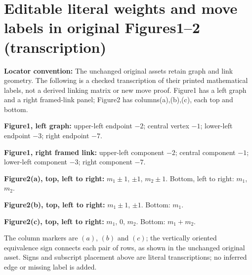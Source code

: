 \section*{Editable literal weights and move labels in original Figures1--2 (transcription)}
\noindent\textbf{Locator convention:} The unchanged original assets retain graph and link geometry. The following is a checked transcription of their printed mathematical labels, not a derived linking matrix or new move proof. Figure1 has a left graph and a right framed-link panel; Figure2 has columns(a),(b),(c), each top and bottom.
\par\medskip
\noindent\textbf{Figure1, left graph:} upper-left endpoint $-2$; central vertex $-1$; lower-left endpoint $-3$; right endpoint $-7$.
\par\noindent\textbf{Figure1, right framed link:} upper-left component $-2$; central component $-1$; lower-left component $-3$; right component $-7$.
\par\medskip
\noindent\textbf{Figure2(a), top, left to right:} $m_1\pm1$, $\pm1$, $m_2\pm1$. Bottom, left to right: $m_1$, $m_2$.
\par\noindent\textbf{Figure2(b), top, left to right:} $m_1\pm1$, $\pm1$. Bottom: $m_1$.
\par\noindent\textbf{Figure2(c), top, left to right:} $m_1$, $0$, $m_2$. Bottom: $m_1+m_2$.
\par\noindent The column markers are $(a)$, $(b)$ and $(c)$; the vertically oriented equivalence sign  connects each pair of rows, as shown in the unchanged original asset. Signs and subscript placement above are literal transcriptions; no inferred edge or missing label is added.

